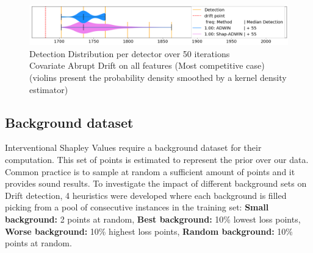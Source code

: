 \documentclass[runningheads]{llncs}
\begin{document}

\begin{figure}[htbp]
        \centering
        \includegraphics[width=0.9\linewidth]{worse_violin.png}
        \caption{Detection Distribution per detector over 50 iterations\\
        Covariate Abrupt Drift on all features (Most competitive case)
        \\ (violins present the probability density smoothed by a kernel density estimator)%
        }
        \label{fig:Worst case}
\end{figure}
\subsection{Background dataset}
\label{section:background}
Interventional Shapley Values require a background dataset for their computation. This set of points is estimated to represent the prior over our data. Common practice is to sample at random a sufficient amount of points and it provides sound results. To investigate the impact of different background sets on Drift detection, 4 heuristics were developed where each background is filled picking from a pool of consecutive instances in the training set: \textbf{Small background:} 2 points at random, \textbf{Best background:} 10\% lowest loss points, \textbf{Worse background:} 10\% highest loss points, \textbf{Random background:} 10\% points at random.
\end{document}
